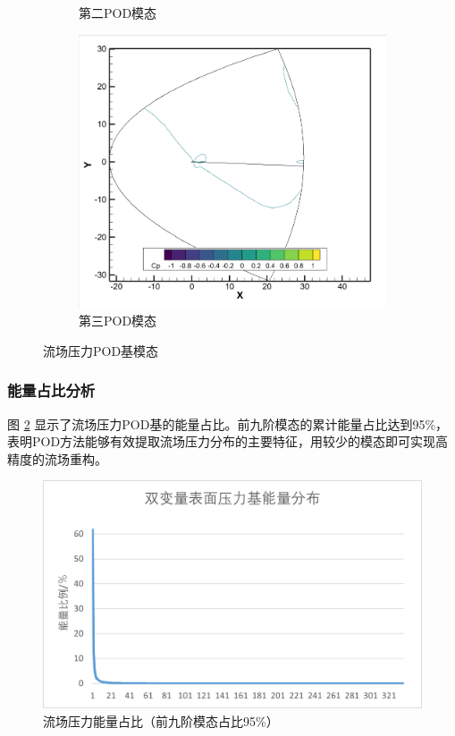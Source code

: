 \begin{figure}[H]
\begin{subfigure}[b]{0.32\textwidth}
        \caption{第二POD模态}
    \end{subfigure}
    \begin{subfigure}[b]{0.32\textwidth}
        \includegraphics[width=\textwidth]{image/基压力分布图/双变量流场压力基3.png}
        \caption{第三POD模态}
    \end{subfigure}
    \caption{\songti 流场压力POD基模态}
    \label{fig:double_flow_pod_modes}
\end{figure}

\subsubsection{能量占比分析}

图 \ref{fig:double_flow_energy} 显示了流场压力POD基的能量占比。前九阶模态的累计能量占比达到95\%，表明POD方法能够有效提取流场压力分布的主要特征，用较少的模态即可实现高精度的流场重构。

\begin{figure}[H]
    \centering
    \includegraphics[width=0.8\linewidth]{image/基能量分布/双变量流场压力基能量分布.png}
    \caption{\songti 流场压力能量占比（前九阶模态占比95\%）}
    \label{fig:double_flow_energy}
\end{figure}

